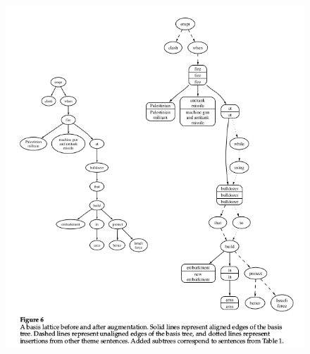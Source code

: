 \documentclass[xcolor={table}]{beamer}
\begin{document}
\begin{frame}[t]{\cite{barzilay2005sentence}}
      \begin{figure}[h]
          \centering
      \includegraphics[scale=.3]{images/figure6-barzilay05.png} \\
\end{figure}
\end{frame}
\end{document}
